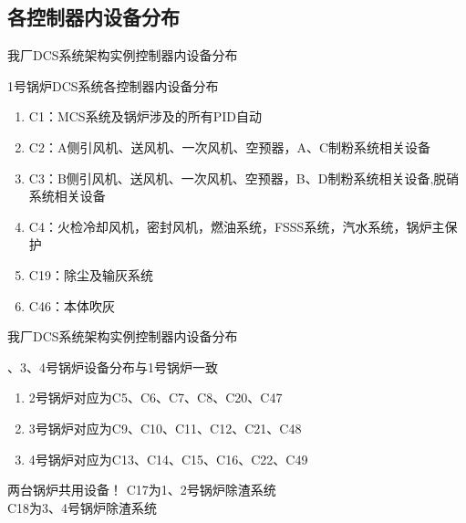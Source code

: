 \documentclass[12pt,hyperref={CJKbookmarks=true}]{beamer} %
\begin{document}
\subsection{各控制器内设备分布}
\begin{frame}{我厂DCS系统架构实例}{控制器内设备分布}
\begin{block}{\heiti 1号锅炉DCS系统各控制器内设备分布}
			\begin{enumerate}
				\item  C1：MCS系统及锅炉涉及的所有PID自动
				
				\item   C2：A侧引风机、送风机、一次风机、空预器，A、C制粉系统相关设备
				
				\item  C3：B侧引风机、送风机、一次风机、空预器，B、D制粉系统相关设备,脱硝系统相关设备
				
				\item  C4：火检冷却风机，密封风机，燃油系统，FSSS系统，汽水系统，锅炉主保护
				
				\pause
				\item  C19：除尘及输灰系统
				\item  C46：本体吹灰
				
		\end{enumerate}
		\end{block}
\end{frame}
\begin{frame}{我厂DCS系统架构实例}{控制器内设备分布}
\begin{block}{、3、4号锅炉设备分布与1号锅炉一致}
			\begin{enumerate}
		
				\item  2号锅炉对应为C5、C6、C7、C8、C20、C47
\pause
				\item  3号锅炉对应为C9、C10、C11、C12、C21、C48
				\pause
				\item  4号锅炉对应为C13、C14、C15、C16、C22、C49
\end{enumerate}
		\end{block}
\begin{alertblock}{\heiti 两台锅炉共用设备！}
			C17为1、2号锅炉除渣系统\\  C18为3、4号锅炉除渣系统
		\end{alertblock}
\end{frame}
\end{document}
